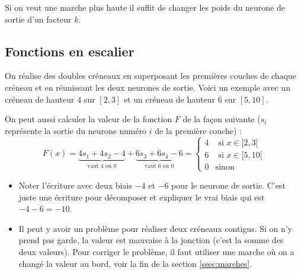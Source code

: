 \documentclass[11pt,class=report,crop=false]{standalone}
\begin{document}
Si on veut une marche plus haute il suffit de changer les poids du neurone de sortie d'un facteur $k$.

\begin{center}
\begin{minipage}{0.55\textwidth}
\end{minipage}
\begin{minipage}{0.35\textwidth}
\end{minipage}
\end{center} 

\subsection{Fonctions en escalier}
On réalise des doubles créneaux en superposant les premières couches de chaque créneau et en réunissant les deux neurones de sortie. Voici un exemple avec un créneau de hauteur $4$ sur $[2,3]$ et un créneau de hauteur $6$ sur $[5,10]$.

\begin{center}
\begin{minipage}{0.50\textwidth}
\end{minipage}
\begin{minipage}{0.45\textwidth}
\end{minipage}
\end{center} 


On peut aussi calculer la valeur de la fonction $F$ de la façon suivante ($s_i$ représente la sortie du neurone numéro $i$ de la première couche) :
$$F(x) = \underbrace{4s_1+4s_2-4}_{\text{vaut $4$ ou $0$}} + \underbrace{6s_3+6s_4-6}_{\text{vaut $6$ ou $0$}} = 
\begin{cases}
4 & \text{ si } x \in [2,3[ \\
6 & \text{ si } x \in [5,10[ \\
0 & \text {sinon}
\end{cases}
$$

\begin{remarque*}
\sauteligne
\begin{itemize}
  \item Noter l'écriture avec deux biais $-4$ et $-6$ pour le neurone de sortie. C'est juste une écriture pour décomposer et expliquer le \og{}vrai\fg{} biais qui est $-4-6 = -10$.

  \item Il peut y avoir un problème pour réaliser deux créneaux contigus. Si on n'y prend pas garde, la valeur est mauvaise à la jonction (c'est la somme des deux valeurs). Pour corriger le problème, il faut utiliser une marche où on a changé la valeur au bord, voir la fin de la section \ref{ssec:marches}.
  
 
\end{itemize}
\end{remarque*} 
\end{document}

